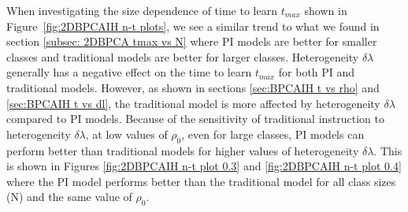 When investigating the size dependence of time to learn $t_{max}$ shown in Figure~\ref{fig:2DBPCAIH n-t plots}, we see a similar trend to what we found in section \ref{subsec: 2DBPCA tmax vs N} where PI models are better for smaller classes and traditional models are better for larger classes.
Heterogeneity $\delta\lambda$ generally has a negative effect on the time to learn $t_{max}$ for both PI and traditional models.
However, as shown in sections \ref{sec:BPCAIH t vs rho} and \ref{sec:BPCAIH t vs dl}, the traditional model is more affected by heterogeneity $\delta\lambda$ compared to PI models.
Because of the sensitivity of traditional instruction to heterogeneity $\delta\lambda$, at low values of $\rho_0$, even for large classes, PI models can perform better than traditional models for higher values of heterogeneity $\delta\lambda$.
This is shown in Figures \ref{fig:2DBPCAIH n-t plot 0.3} and \ref{fig:2DBPCAIH n-t plot 0.4} where the PI model performs better than the traditional model for all class sizes (N) and the same value of $\rho_0$.

